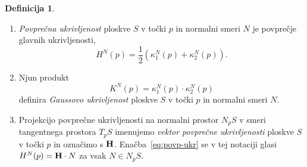\documentclass[12pt,a4paper,twoside]{article}
\theoremstyle{definition} %
\newtheorem{definicija}{Definicija}[section]
\theoremstyle{plain} %
\numberwithin{equation}{section}  %
\begin{document}
\begin{definicija}
\begin{enumerate}
\item
\emph{Povprečna ukrivljenost} ploskve $S$ v točki $p$ in normalni smeri $N$ je povprečje glavnih ukrivljenosti,
\begin{equation} \label{eq:povp-ukr}
H^{N}(p) = \frac{1}{2} \left(\kappa _{1}^{N}(p) + \kappa _{2}^{N}(p) \right).
\end{equation}
\item
Njun produkt 
\begin{equation} \label{eq:Gauss-ukr}
K^{N}(p) = \kappa _{1}^{N}(p) \cdot \kappa _{2}^{N}(p)
\end{equation}
definira \emph{Gaussovo ukrivljenost} ploskve $S$ v točki $p$ in normalni smeri $N$.
\item
Projekcijo povprečne ukrivljenosti na normalni prostor $N_{p}S$ v smeri tangentnega prostora $T_{p}S$ imenujemo \emph{vektor povprečne ukrivljenosti} ploskve $S$ v točki $p$ in označimo s $\textbf{\textup{H}}$. Enačba~\eqref{eq:povp-ukr} se v tej notaciji glasi $H^{N}(p) = \textbf{\textup{H}} \cdot N$ za vsak $N \in N_{p}S$.
\end{enumerate}
\end{definicija}
\end{document}
